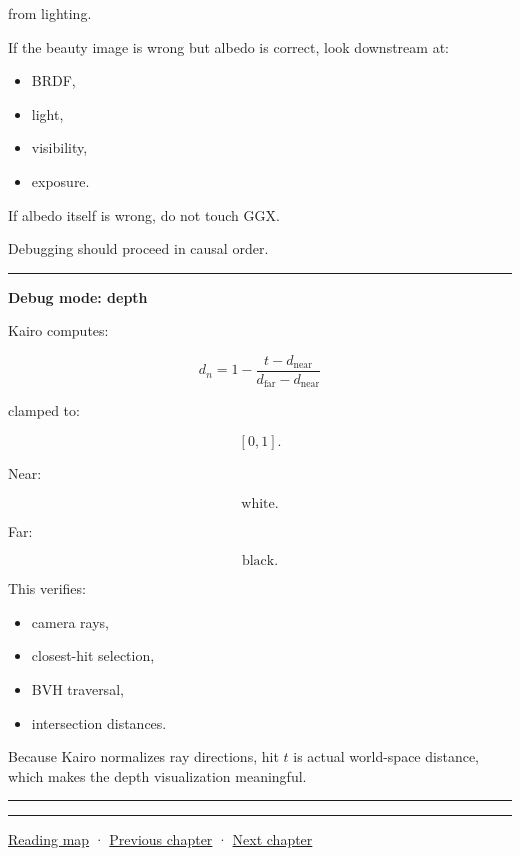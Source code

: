 from lighting.

If the beauty image is wrong but albedo is correct, look downstream at:

\begin{itemize}
\tightlist
\item
  BRDF,
\item
  light,
\item
  visibility,
\item
  exposure.
\end{itemize}

If albedo itself is wrong, do not touch GGX.

Debugging should proceed in causal order.

\begin{center}\rule{0.5\linewidth}{0.5pt}\end{center}

\textbf{Debug mode: depth}

Kairo computes:

\[
d_n
=
1-
\frac{
t-d_{\text{near}}
}{
d_{\text{far}}-d_{\text{near}}
}
\]

clamped to:

\[
[0,1].
\]

Near:

\[
\text{white}.
\]

Far:

\[
\text{black}.
\]

This verifies:

\begin{itemize}
\tightlist
\item
  camera rays,
\item
  closest-hit selection,
\item
  BVH traversal,
\item
  intersection distances.
\end{itemize}

Because Kairo normalizes ray directions, hit \(t\) is actual world-space distance, which makes the depth visualization meaningful.

\begin{center}\rule{0.5\linewidth}{0.5pt}\end{center}

\begin{center}\rule{0.5\linewidth}{0.5pt}\end{center}

\hyperref[volume-reading-map]{Reading map} · \hyperref[03-visual-computing-i-ch009]{Previous chapter} · \hyperref[03-visual-computing-i-ch011]{Next chapter}

